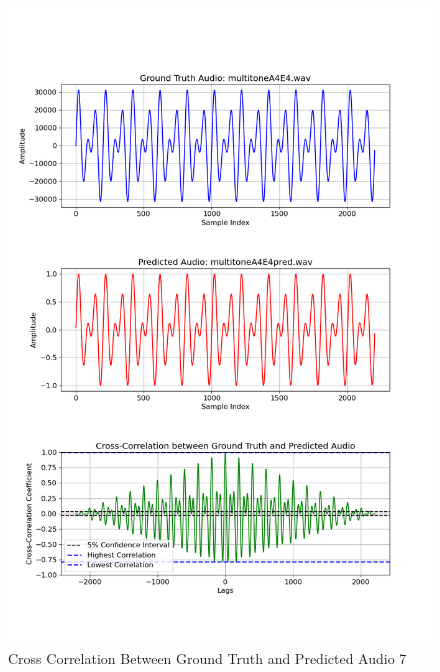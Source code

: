 \documentclass{ioereport}
\begin{document}
    \begin{figure}[H]
        \centering
        \includegraphics[width=\linewidth]{assets/crosscorrelation/cross_correlation_multitoneA4E4.wav_multitoneA4E4pred.wav.png}
        \caption{Cross Correlation Between Ground Truth and Predicted Audio 7}
        \label{fig:cross-correlation-7}
    \end{figure}
\end{document}
